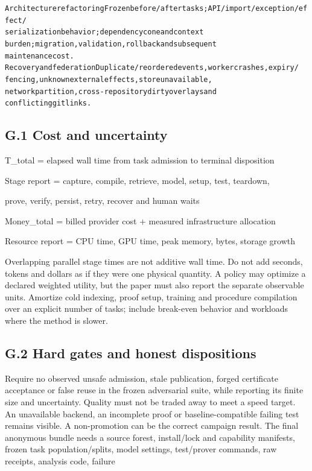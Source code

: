 \documentclass{article}
\begin{document}
\begin{alltt}
Architecture refactoring                     Frozen before/after tasks; API/import/exception/effect/
                                             serialization behavior; dependency cone and context
                                             burden; migration, validation, rollback and subsequent
                                             maintenance cost.
Recovery and federation                      Duplicate/reordered events, worker crashes, expiry/
                                             fencing, unknown external effects, store unavailable,
                                             network partition, cross-repository dirty overlays and
                                             conflicting gitlinks.
\end{alltt}\endgroup


\subsection*{G.1 Cost and uncertainty}

\noindent T\_total = elapsed wall time from task admission to terminal disposition\par
\noindent Stage report = capture, compile, retrieve, model, setup, test, teardown,\par
\noindent prove, verify, persist, retry, recover and human waits\par
\noindent Money\_total = billed provider cost + measured infrastructure allocation\par
\noindent Resource report = CPU time, GPU time, peak memory, bytes, storage growth\par

Overlapping parallel stage times are not additive wall time. Do not add seconds, tokens and dollars as
if they were one physical quantity. A policy may optimize a declared weighted utility, but the paper
must also report the separate observable units. Amortize cold indexing, proof setup, training and
procedure compilation over an explicit number of tasks; include break-even behavior and workloads
where the method is slower.

\subsection*{G.2 Hard gates and honest dispositions}

Require no observed unsafe admission, stale publication, forged certificate acceptance or false reuse in
the frozen adversarial suite, while reporting its finite size and uncertainty. Quality must not be traded
away to meet a speed target. An unavailable backend, an incomplete proof or baseline-compatible
failing test remains visible. A non-promotion can be the correct campaign result.
The final anonymous bundle needs a source forest, install/lock and capability manifests, frozen
task population/splits, model settings, test/prover commands, raw receipts, analysis code, failure
\end{document}
